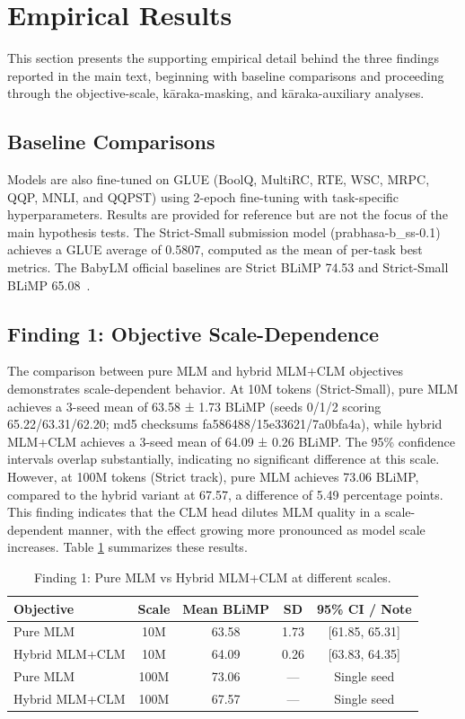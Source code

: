 \section{Empirical Results}

This section presents the supporting empirical detail behind the three findings reported in the main text, beginning with baseline comparisons and proceeding through the objective-scale, k\=araka-masking, and k\=araka-auxiliary analyses.

\subsection{Baseline Comparisons}

Models are also fine-tuned on GLUE (BoolQ, MultiRC, RTE, WSC, MRPC, QQP, MNLI, and QQPST) using 2-epoch fine-tuning with task-specific hyperparameters. Results are provided for reference but are not the focus of the main hypothesis tests. The Strict-Small submission model (prabhasa-b\_ss-0.1) achieves a GLUE average of 0.5807, computed as the mean of per-task best metrics. The BabyLM official baselines are Strict BLiMP 74.53 and Strict-Small BLiMP 65.08~\cite{Hu2024BabyLM}.

\subsection{Finding 1: Objective Scale-Dependence}

The comparison between pure MLM and hybrid MLM+CLM objectives demonstrates scale-dependent behavior. At 10M tokens (Strict-Small), pure MLM achieves a 3-seed mean of 63.58 ± 1.73 BLiMP (seeds 0/1/2 scoring 65.22/63.31/62.20; md5 checksums fa586488/15e33621/7a0bfa4a), while hybrid MLM+CLM achieves a 3-seed mean of 64.09 ± 0.26 BLiMP. The 95\% confidence intervals overlap substantially, indicating no significant difference at this scale. However, at 100M tokens (Strict track), pure MLM achieves 73.06 BLiMP, compared to the hybrid variant at 67.57, a difference of 5.49 percentage points. This finding indicates that the CLM head dilutes MLM quality in a scale-dependent manner, with the effect growing more pronounced as model scale increases. Table \ref{tab:f1-results} summarizes these results.

\begin{table}[h]
\centering
\small
\caption{Finding 1: Pure MLM vs Hybrid MLM+CLM at different scales.}
\label{tab:f1-results}
\begin{tabular}{lcccc}
\toprule
Objective & Scale & Mean BLiMP & SD & 95\% CI / Note \\
\midrule
Pure MLM & 10M & 63.58 & 1.73 & [61.85, 65.31] \\
Hybrid MLM+CLM & 10M & 64.09 & 0.26 & [63.83, 64.35] \\
Pure MLM & 100M & 73.06 & — & Single seed \\
Hybrid MLM+CLM & 100M & 67.57 & — & Single seed \\
\bottomrule
\end{tabular}
\end{table}

